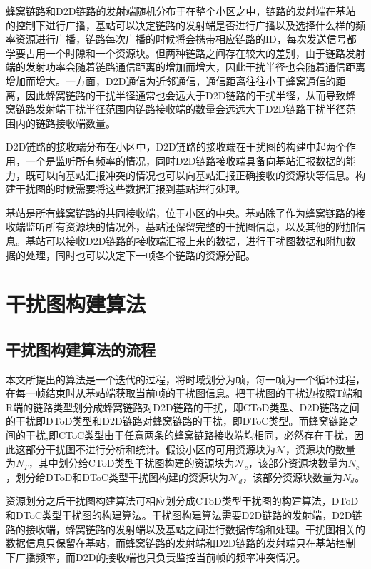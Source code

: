 \documentclass[figurelist,tablelist,algorithmlist,nomlist,masters]{seuthesix}
\begin{document}
	蜂窝链路和D2D链路的发射端随机分布于在整个小区之中，链路的发射端在基站的控制下进行广播，基站可以决定链路的发射端是否进行广播以及选择什么样的频率资源进行广播，链路每次广播的时候将会携带相应链路的ID，每次发送信号都学要占用一个时隙和一个资源块。但两种链路之间存在较大的差别，由于链路发射端的发射功率会随着链路通信距离的增加而增大，因此干扰半径也会随着通信距离增加而增大。一方面，D2D通信为近邻通信，通信距离往往小于蜂窝通信的距离，因此蜂窝链路的干扰半径通常也会远大于D2D链路的干扰半径，从而导致蜂窝链路发射端干扰半径范围内链路接收端的数量会远远大于D2D链路干扰半径范围内的链路接收端数量。
	
	D2D链路的接收端分布在小区中，D2D链路的接收端在干扰图的构建中起两个作用，一个是监听所有频率的情况，同时D2D链路接收端具备向基站汇报数据的能力，既可以向基站汇报冲突的情况也可以向基站汇报正确接收的资源块等信息。构建干扰图的时候需要将这些数据汇报到基站进行处理。
	
	基站是所有蜂窝链路的共同接收端，位于小区的中央。基站除了作为蜂窝链路的接收端监听所有资源块的情况外，基站还保留完整的干扰图信息，以及其他的附加信息。基站可以接收D2D链路的接收端汇报上来的数据，进行干扰图数据和附加数据的处理，同时也可以决定下一帧各个链路的资源分配。
	
	
	\section{干扰图构建算法}
	
	\subsection{干扰图构建算法的流程}
	本文所提出的算法是一个迭代的过程，将时域划分为帧，每一帧为一个循环过程，在每一帧结束时从基站端获取当前帧的干扰图信息。把干扰图的干扰边按照T端和R端的链路类型划分成蜂窝链路对D2D链路的干扰，即CToD类型、D2D链路之间的干扰即DToD类型和D2D链路对蜂窝链路的干扰，即DToC类型。而蜂窝链路之间的干扰,即CToC类型由于任意两条的蜂窝链路接收端均相同，必然存在干扰，因此这部分干扰图不进行分析和统计。假设小区的可用资源块为$\mathcal{N}$，资源块的数量为$N_T$，其中划分给CToD类型干扰图构建的资源块为$\mathcal{N}_c$，该部分资源块数量为$N_c$，划分给DToD和DToC类型干扰图构建的资源块为$\mathcal{N}_d$，该部分资源块数量为$N_d$。
	
	资源划分之后干扰图构建算法可相应划分成CToD类型干扰图的构建算法，DToD和DToC类型干扰图的构建算法。干扰图构建算法需要D2D链路的发射端，D2D链路的接收端，蜂窝链路的发射端以及基站之间进行数据传输和处理。干扰图相关的数据信息只保留在基站，而蜂窝链路的发射端和D2D链路的发射端只在基站控制下广播频率，而D2D的接收端也只负责监控当前帧的频率冲突情况。
	
\end{document}
